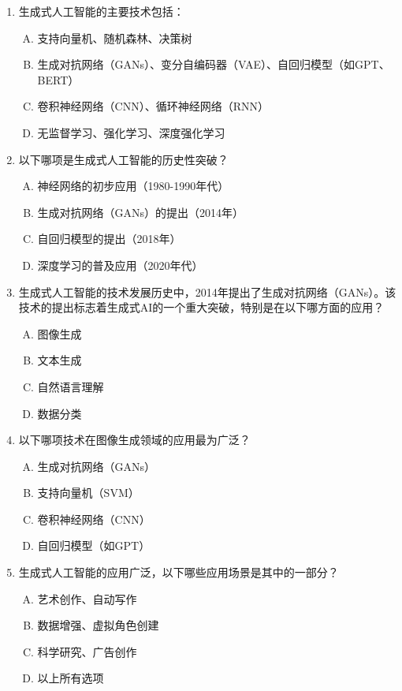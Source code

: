 \begin{enumerate}
    \item 生成式人工智能的主要技术包括：
    \begin{enumerate}[A.]
        \item 支持向量机、随机森林、决策树
        \item 生成对抗网络（GANs）、变分自编码器（VAE）、自回归模型（如GPT、BERT）
        \item 卷积神经网络（CNN）、循环神经网络（RNN）
        \item 无监督学习、强化学习、深度强化学习
    \end{enumerate}
    
    \item 以下哪项是生成式人工智能的历史性突破？
    \begin{enumerate}[A.]
        \item 神经网络的初步应用（1980-1990年代）
        \item 生成对抗网络（GANs）的提出（2014年）
        \item 自回归模型的提出（2018年）
        \item 深度学习的普及应用（2020年代）
    \end{enumerate}
    
    \item 生成式人工智能的技术发展历史中，2014年提出了生成对抗网络（GANs）。该技术的提出标志着生成式AI的一个重大突破，特别是在以下哪方面的应用？
    \begin{enumerate}[A.]
        \item 图像生成  
        \item 文本生成  
        \item 自然语言理解  
        \item 数据分类  
    \end{enumerate}
    
    \item 以下哪项技术在图像生成领域的应用最为广泛？
    \begin{enumerate}[A.]
        \item 生成对抗网络（GANs）
        \item 支持向量机（SVM）
        \item 卷积神经网络（CNN）
        \item 自回归模型（如GPT）
    \end{enumerate}
    
    \item 生成式人工智能的应用广泛，以下哪些应用场景是其中的一部分？
    \begin{enumerate}[A.]
        \item 艺术创作、自动写作
        \item 数据增强、虚拟角色创建
        \item 科学研究、广告创作
        \item 以上所有选项
    \end{enumerate}
    
\end{enumerate}

